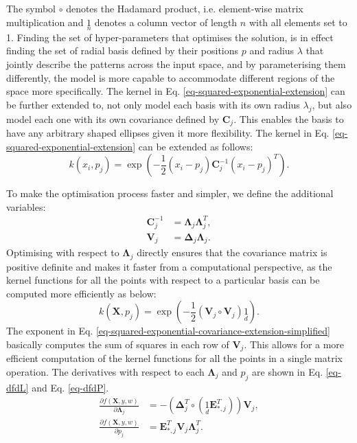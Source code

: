 \documentclass[useAMS,usenatbib,fleqn]{mn2e}
\newcommand{\bm}[1]{\mathbf{#1} }
\begin{document}
The symbol $\circ$ denotes the Hadamard product, i.e. element-wise matrix multiplication and $\underset{n}{1}$ denotes a column vector of length $n$ with all elements set to 1. Finding the set of hyper-parameters that optimises the solution, is in effect finding the set of radial basis defined by their positions $p$ and radius $\lambda$ that jointly describe the patterns across the input space, and by parameterising them differently, the model is more capable to accommodate different regions of the space more specifically. The kernel in Eq. \eqref{eq-squared-exponential-extension} can be further extended to, not only model each basis with its own radius $\lambda_{j}$, but also model each one with its own covariance defined by $\bm{C}_{j}$. This enables the basis to have any arbitrary shaped ellipses given it more flexibility. The kernel in Eq. \eqref{eq-squared-exponential-extension} can be extended as follows:
\begin{equation}
\label{eq-squared-exponential-covariance-extension}
k(x_{i},p_{j}) = \exp{\left(-\frac{1}{2}\left(x_{i}-p_{j}\right)\bm{C}_{j}^{-1}\left(x_{i}-p_{j}\right)^{T}\right)}.
\end{equation}

To make the optimisation process faster and simpler, we define the additional variables:
\begin{subequations}
\begin{align}
\label{eq-Cinv}
\bm{C}_{j}^{-1} &= \bm{\Lambda}_{j}\bm{\Lambda}_{j}^{T},\\
\label{eq-V_j}
\bm{V}_{j} &= \bm{\Delta}_{j}\bm{\Lambda}_{j}.
\end{align}
\end{subequations}
Optimising with respect to $\bm{\Lambda}_{j}$ directly ensures that the covariance matrix is positive definite and makes it faster from a computational perspective, as the kernel functions for all the points with respect to a particular basis can be computed more efficiently as below:
\begin{equation}
\label{eq-squared-exponential-covariance-extension-simplified}
k(\bm{X},p_{j}) = \exp{\left(-\frac{1}{2}\left(\bm{V}_{j}\circ \bm{V}_{j}\right)\underset{d}{1}\right)}.
\end{equation}
The exponent in Eq. \eqref{eq-squared-exponential-covariance-extension-simplified} basically computes the sum of squares in each row of $\bm{V}_{j}$. This allows for a more efficient computation of the kernel functions for all the points in a single matrix operation. The derivatives with respect to each $\bm{\Lambda}_{j}$ and $p_{j}$ are shown in Eq. \eqref{eq-dfdL} and Eq. \eqref{eq-dfdP}.
\begin{subequations}
\begin{align}
\label{eq-dfdL}
\frac{\partial f(\bm{X},y,w)}{\partial \bm{\Lambda}_{j}} &= -\left( \bm{\Delta}_{j}^{T}\circ \left(\underset{d}{1}\bm{E}_{*,j}^{T}\right) \right)\bm{V}_{j},\\
\label{eq-dfdP}
\frac{\partial f(\bm{X},y,w)}{\partial p_{j}} &= \bm{E}_{*,j}^{T}\bm{V}_{j}\bm{\Lambda}_{j}^{T}.
\end{align}
\end{subequations}
\end{document}
